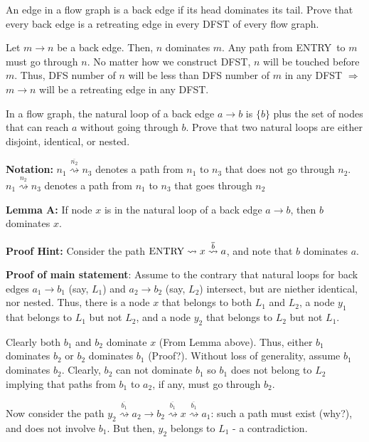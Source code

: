 \documentclass[12pt]{article}
\newcommand{\answer}[1]{{{\blue #1}}}
\newcommand{\ques}[1]{\bigskip\noindent{\bf Q#1.}}
\begin{document}
\bigskip
\ques{3} An edge in a flow graph is a back edge if its head
  dominates its tail. Prove that every back edge is a retreating
  edge in every DFST of every flow graph.
\newcommand{\pentry}{\mbox{\rm ENTRY}}

  \answer{  Let $m  \rightarrow  n$  be a  back  edge. Then,  $n$
    dominates $m$.  Any path  from \pentry\ to  $m$ must  go through
    $n$. No  matter how  we construct DFST,  $n$ will  be touched
    before $m$.  Thus, DFS number  of $n$  will be less  than DFS
    number of  $m$ in  any DFST  $\Rightarrow$ $m  \rightarrow n$
    will be a retreating edge in any DFST.  }

\bigskip
\ques{4} In  a  flow  graph,  the  natural  loop  of  a  back  edge
  $a\rightarrow  b$  is $\{b\}$  plus the set  of nodes  that can
  reach $a$  without going through  $b$.  Prove that  two natural
  loops are either disjoint, identical, or nested.

\answer{
\newcommand{\pfree}[1]{\ensuremath{\stackrel{\overline{#1}}{\rightsquigarrow}}}
\newcommand{\phas}[1]{\ensuremath{\stackrel{{#1}}{\rightsquigarrow}}}

{\bf Notation:} $n_1 \pfree{n_2} n_3$ denotes a path from $n_1$ to $n_3$ that does not go through $n_2$. $n_1 \phas{n_2} n_3$ denotes a path from $n_1$ to $n_3$ that  goes through $n_2$ 


{\bf Lemma A:} If node $x$ is in the  natural  loop  of  a  back  edge $a\rightarrow b$, then $b$ dominates $x$.

{\bf Proof Hint:} Consider the path $\pentry\rightsquigarrow x\pfree{b}a$, and note that $b$ dominates $a$.


{\bf Proof of main statement}:   Assume to the contrary that natural loops for back edges $a_1\rightarrow b_1$ (say, $L_1$) and $a_2\rightarrow b_2$ (say, $L_2$) intersect, but are niether identical, nor nested. Thus, there is a node $x$ that belongs to both $L_1$ and $L_2$, a node $y_1$ that belongs to $L_1$ but not $L_2$, and a node $y_2$  that belongs to $L_2$ but not $L_1$.

Clearly both $b_1$ and $b_2$ dominate $x$ (From Lemma above). Thus, either $b_1$ dominates $b_2$ or $b_2$ dominates $b_1$ (Proof?). Without loss of generality, assume $b_1$ dominates $b_2$. Clearly, $b_2$ can not dominate $b_1$ so $b_1$ does not belong to $L_2$ implying that paths from $b_1$ to $a_2$, if any, must go through $b_2$.

Now consider the path $y_2\pfree{b_1} a_2 \rightarrow b_2 \pfree{b_1} x \pfree{b_1} a_1$: such a path must exist (why?), and does not involve $b_1$.  But then, $y_2$ belongs to $L_1$ - a contradiction.
}
\end{document}
